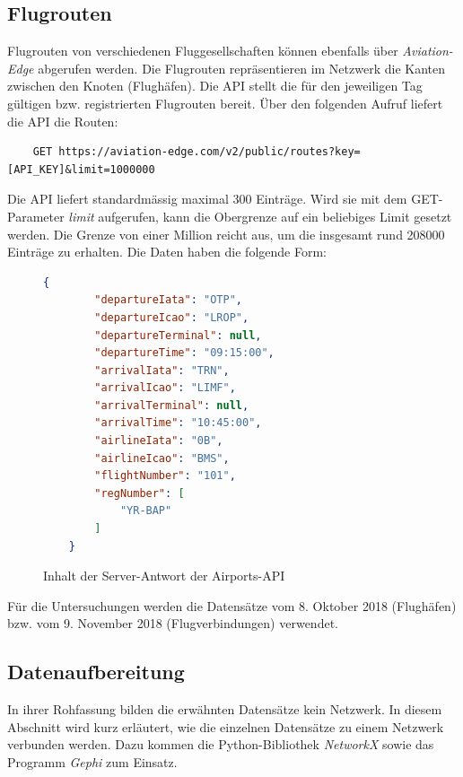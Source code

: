 \subsection{Flugrouten}
\label{sec:routes}

Flugrouten von verschiedenen Fluggesellschaften können ebenfalls über \textit{Aviation-Edge} abgerufen werden.
Die Flugrouten repräsentieren im Netzwerk die Kanten zwischen den Knoten (Flughäfen).
Die API stellt die für den jeweiligen Tag gültigen bzw. registrierten Flugrouten bereit.
Über den folgenden Aufruf liefert die API die Routen:
\begin{lstlisting}
    GET https://aviation-edge.com/v2/public/routes?key=[API_KEY]&limit=1000000
\end{lstlisting}

Die API liefert standardmässig maximal 300 Einträge. Wird sie mit dem GET-Parameter \textit{limit} aufgerufen, kann
die Obergrenze auf ein beliebiges Limit gesetzt werden.
Die Grenze von einer Million reicht aus, um die insgesamt rund 208000 Einträge zu erhalten.
Die Daten haben die folgende Form:

\begin{figure}[ht]
    \centering
    \begin{lstlisting}[language=json]
    {
        "departureIata": "OTP",
        "departureIcao": "LROP",
        "departureTerminal": null,
        "departureTime": "09:15:00",
        "arrivalIata": "TRN",
        "arrivalIcao": "LIMF",
        "arrivalTerminal": null,
        "arrivalTime": "10:45:00",
        "airlineIata": "0B",
        "airlineIcao": "BMS",
        "flightNumber": "101",
        "regNumber": [
            "YR-BAP"
        ]
    }
    \end{lstlisting}
    \caption{Inhalt der Server-Antwort der Airports-API}
    \label{lst:routesAPIResponse}
\end{figure}

Für die Untersuchungen werden die Datensätze vom 8. Oktober 2018 (Flughäfen) bzw. vom 9. November 2018 (Flugverbindungen) verwendet.


\subsection{Datenaufbereitung}
\label{subsec:dataCleancing}

In ihrer Rohfassung bilden die erwähnten Datensätze kein Netzwerk.
In diesem Abschnitt wird kurz erläutert, wie die einzelnen Datensätze zu einem Netzwerk verbunden werden.
Dazu kommen die Python-Bibliothek \textit{NetworkX} sowie das Programm \textit{Gephi} zum Einsatz.

